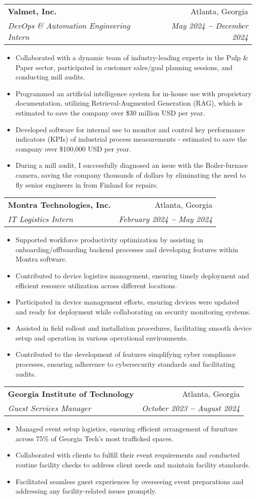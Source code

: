 \documentclass[letterpaper,11pt]{article}
\makeatletter
\newcommand{\resumeItem}[1]{
  \item\small{
    {#1 \vspace{-2pt}}
  }
}
\newcommand{\resumeSubheading}[4]{
  \vspace{-2pt}\item
    \begin{tabular*}{0.97\textwidth}[t]{l@{\extracolsep{\fill}}r}
      \textbf{#1} & #2 \\
      \textit{\small#3} & \textit{\small #4} \\
    \end{tabular*}\vspace{-7pt}
}
\newcommand{\resumeItemListStart}{\begin{itemize}}
\newcommand{\resumeItemListEnd}{\end{itemize}\vspace{-5pt}}
\makeatother
\begin{document}
  \resumeSubheading
      {Valmet, Inc.}{Atlanta, Georgia}
      {DevOps \& Automation Engineering Intern}{May 2024 \textbf{--} December 2024}
        \resumeItemListStart

        \resumeItem{Collaborated with a dynamic team of industry-leading experts in the Pulp \& Paper sector, participated in customer sales/goal planning sessions, and conducting mill audits.}
        \resumeItem{Programmed an artificial intelligence system for in-house use with proprietary documentation, utilizing Retrieval-Augmented Generation (RAG), which is estimated to save the company over \$30 million USD per year.}
        \resumeItem{Developed software for internal use to monitor and control key performance indicators (KPIs) of industrial process measurements - estimated to save the company over \$100,000 USD per year.}
        \resumeItem{During a mill audit, I successfully diagnosed an issue with the Boiler-furnace camera, saving the company thousands of dollars by eliminating the need to fly senior engineers in from Finland for repairs.}
        \resumeItemListEnd
    \resumeSubheading
      {Montra Technologies, Inc.}{Atlanta, Georgia}
      {IT Logistics Intern}{February 2024 \textbf{--} May 2024}
        \resumeItemListStart
        \resumeItem{Supported workforce productivity optimization by assisting in onboarding/offboarding backend processes and developing features within Montra software.}
        \resumeItem{Contributed to device logistics management, ensuring timely deployment and efficient resource utilization across different locations.}
        \resumeItem{Participated in device management efforts, ensuring devices were updated and ready for deployment while collaborating on security monitoring systems.}
        \resumeItem{Assisted in field rollout and installation procedures, facilitating smooth device setup and operation in various operational environments.}
        \resumeItem{Contributed to the development of features simplifying cyber compliance processes, ensuring adherence to cybersecurity standards and facilitating audits.}
        \resumeItemListEnd

  \resumeSubheading
      {Georgia Institute of Technology}{Atlanta, Georgia}
      {Guest Services Manager}{October 2023 \textbf{--} August 2024}
        \resumeItemListStart
            \resumeItem{Managed event setup logistics, ensuring efficient arrangement of furniture across 75\% of Georgia Tech's most trafficked spaces.}
            \resumeItem{Collaborated with clients to fulfill their event requirements and conducted routine facility checks to address client needs and maintain facility standards.}
            \resumeItem{Facilitated seamless guest experiences by overseeing event preparations and addressing any facility-related issues promptly.}
        \resumeItemListEnd
\end{document}
